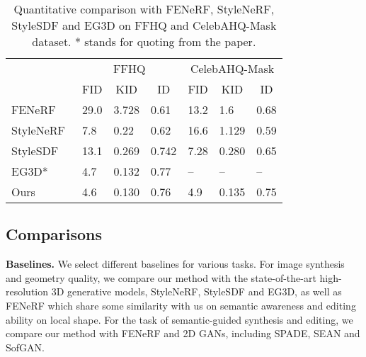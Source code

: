 \documentclass[acmtog]{acmart}
\begin{document}
\begin{table}[t]
\centering
\begin{tabular}{l|lll|lll} 
\hline
                   & \multicolumn{3}{c}{FFHQ}                                                                                   \vline  & \multicolumn{3}{c}{CelebAHQ-Mask}                                                                             \\
                   & \multicolumn{1}{c}{FID} & \multicolumn{1}{c}{KID} & \multicolumn{1}{c}{ID}
                   \vline & \multicolumn{1}{c}{FID} & \multicolumn{1}{c}{KID} & \multicolumn{1}{c}{ID}  \\ 
\hline
FENeRF~      & 29.0                                & 3.728                                & 0.61                                 & 13.2                                & 1.6                                 & 0.68                                  \\
StyleNeRF~ & 7.8                                 & 0.22                                 &  0.62                                & 16.6                                   & 1.129                                    & 0.59                                 \\
StyleSDF~  & 13.1                                & 0.269                                &  0.742                                & 7.28                                    &  0.280                                   &  0.65                                 \\
EG3D*~      & 4.7                                 & 0.132                                    &  0.77                                & --                                    & --                                    & --                            \\

Ours~     & 4.6                                 &       0.130                               &      0.76                            & 4.9                                     & 0.135                                    & 0.75                                  \\
\hline
\end{tabular}
  \caption{Quantitative comparison with FENeRF, StyleNeRF, StyleSDF and EG3D on FFHQ and CelebAHQ-Mask dataset. * stands for quoting from the paper.}
  \label{tab:comparison}
\end{table}

\subsection{Comparisons}
\label{sec:4.1}
\noindent \textbf{Baselines.} We select different baselines for various tasks. For image synthesis and geometry quality, we compare our method with the state-of-the-art high-resolution 3D generative models, StyleNeRF, StyleSDF and EG3D, as well as FENeRF which share some similarity with us on semantic awareness and editing ability on local shape. For the task of semantic-guided synthesis and editing, we compare our method with FENeRF and 2D GANs, including SPADE, SEAN and SofGAN. 
\end{document}
